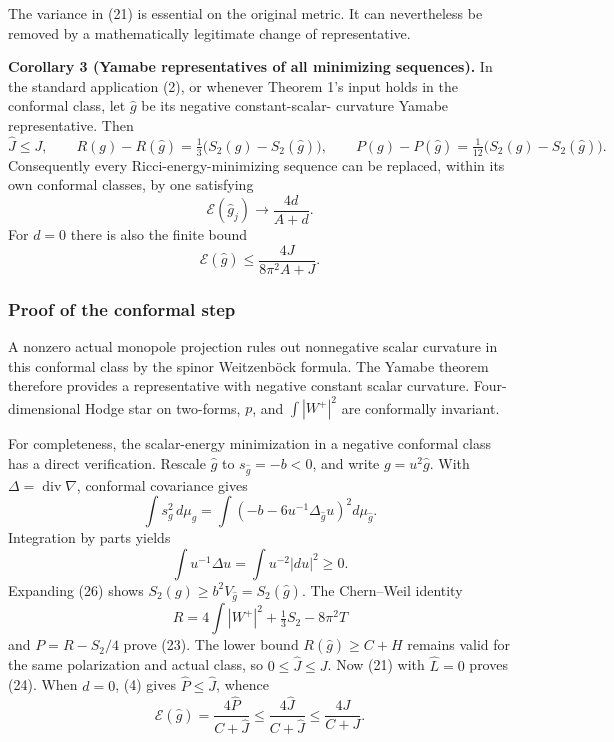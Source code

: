 \documentclass[
  11pt,
]{article}
\begin{document}
The variance in (21) is essential on the original metric. It can
nevertheless be removed by a mathematically legitimate change of
representative.

\textbf{Corollary 3 (Yamabe representatives of all minimizing
sequences).} In the standard application (2), or whenever Theorem 1's
input holds in the conformal class, let \(\widehat g\) be its negative
constant-scalar- curvature Yamabe representative. Then \[
 \widehat J\le J,\qquad
 R(g)-R(\widehat g)
       =\tfrac13\bigl(S_2(g)-S_2(\widehat g)\bigr),\qquad
 P(g)-P(\widehat g)
       =\tfrac1{12}\bigl(S_2(g)-S_2(\widehat g)\bigr).
 \tag{23}
\] Consequently every Ricci-energy-minimizing sequence can be replaced,
within its own conformal classes, by one satisfying \[
 \boxed{\mathcal E(\widehat g_j)\longrightarrow
                  \frac{4d}{A+d}.}
 \tag{24}
\] For \(d=0\) there is also the finite bound \[
 \boxed{\mathcal E(\widehat g)
          \le\frac{4J}{8\pi^2A+J}.}
 \tag{25}
\]

\hypertarget{proof-of-the-conformal-step}{%
\subsubsection{Proof of the conformal
step}\label{proof-of-the-conformal-step}}

A nonzero actual monopole projection rules out nonnegative scalar
curvature in this conformal class by the spinor Weitzenböck formula. The
Yamabe theorem therefore provides a representative with negative
constant scalar curvature. Four-dimensional Hodge star on two-forms,
\(p\), and \(\int|W^+|^2\) are conformally invariant.

For completeness, the scalar-energy minimization in a negative conformal
class has a direct verification. Rescale \(\widehat g\) to
\(s_{\widehat g}=-b<0\), and write \(g=u^2\widehat g\). With
\(\Delta=\operatorname{div}\nabla\), conformal covariance gives \[
 \int s_g^2\,d\mu_g
 =\int\left(-b-6u^{-1}\Delta_{\widehat g}u\right)^2d\mu_{\widehat g}.
 \tag{26}
\] Integration by parts yields \[
 \int u^{-1}\Delta u=\int u^{-2}|du|^2\ge0.
 \tag{27}
\] Expanding (26) shows \(S_2(g)\ge b^2V_{\widehat g}=S_2(\widehat g)\).
The Chern--Weil identity \[
 R=4\int|W^+|^2+\tfrac13 S_2-8\pi^2T
 \tag{28}
\] and \(P=R-S_2/4\) prove (23). The lower bound
\(R(\widehat g)\ge C+H\) remains valid for the same polarization and
actual class, so \(0\le\widehat J\le J\). Now (21) with \(\widehat L=0\)
proves (24). When \(d=0\), (4) gives \(\widehat P\le\widehat J\), whence
\[
 \mathcal E(\widehat g)=
 \frac{4\widehat P}{C+\widehat J}
 \le\frac{4\widehat J}{C+\widehat J}
 \le\frac{4J}{C+J}.
 \tag{29}
\]
\end{document}
